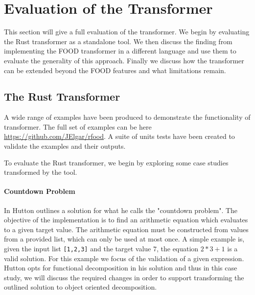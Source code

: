 \documentclass[ oneside,%
                    author={James Elgar},
                    degree={MEng},
                     title={Bidirectional transformer between functional and \\ object-oriented programming in Rust},
                  subtitle={}]{dissertation}
\newcommand{\rust}[1]{\texttt{#1}}
\begin{document}
% 


\chapter{Evaluation of the Transformer}
\label{chap:evaluation}

This section will give a full evaluation of the transformer. We begin by evaluating the Rust transformer as a standalone tool. We then discuss the finding from implementing the FOOD transformer in a different language and use them to evaluate the generality of this approach. Finally we discuss how the transformer can be extended beyond the FOOD features and what limitations remain.


\section{The Rust Transformer}

A wide range of examples have been produced to demonstrate the functionality of transformer. The full set of examples can be here \url{https://github.com/JElgar/rfood}. A suite of units tests have been created to validate the examples and their outputs.

To evaluate the Rust transformer, we begin by exploring some case studies transformed by the tool. 

\subsubsection{Countdown Problem}

In \cite{hutton} Hutton outlines a solution for what he calls the "countdown problem". The objective of the implementation is to find an arithmetic equation which evaluates to a given target value. The arithmetic equation must be constructed from values from a provided list, which can only be used at most once. A simple example is, given the input list \rust{[1,2,3]} and the target value $7$, the equation $2 * 3 + 1$ is a valid solution. For this example we focus of the validation of a given expression. Hutton opts for functional decomposition in his solution and thus in this case study, we will discuss the required changes in order to support transforming the outlined solution to object oriented decomposition.
\end{document}
